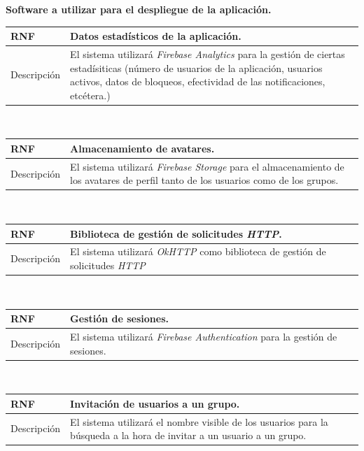 \documentclass[twoside]{report}
\newcommand\addrow[2]{#1 &#2\\ }
\newcommand\addheading[2]{#1 &#2\\ \hline}
\newcommand\tabularhead{\begin{tabular}{lp{0.7\textwidth}}
\hline
}
\newenvironment{req}{\tabularhead}
{\hline\end{tabular}}
\begin{document}
\vspace{1cm}

\textbf{Software a utilizar para el despliegue de la aplicación.}\\

\begin{req}
	\addheading{\textbf{RNF\arabic{nonFunctionalRequirements}}}{Datos estadísticos de la aplicación.}
	\addrow{Descripción}{El sistema utilizará \textit{Firebase Analytics} para la gestión de ciertas estadísiticas (número de usuarios de la aplicación, usuarios activos, datos de bloqueos, efectividad de las notificaciones, etcétera.)}
\end{req}\\

\vspace{0.25cm}

\begin{req}
	\addheading{\textbf{RNF\arabic{nonFunctionalRequirements}}}{Almacenamiento de avatares.}
	\addrow{Descripción}{El sistema utilizará \textit{Firebase Storage} para el almacenamiento de los avatares de perfil tanto de los usuarios como de los grupos.}
\end{req}\\

\vspace{0.25cm}

\begin{req}
	\addheading{\textbf{RNF\arabic{nonFunctionalRequirements}}}{Biblioteca de gestión de solicitudes \textit{HTTP}.}
	\addrow{Descripción}{El sistema utilizará \textit{OkHTTP} como biblioteca de gestión de solicitudes \textit{HTTP}}
\end{req}\\

\vspace{0.25cm}

\begin{req}
	\addheading{\textbf{RNF\arabic{nonFunctionalRequirements}}}{Gestión de sesiones.}
	\addrow{Descripción}{El sistema utilizará \textit{Firebase Authentication} para la gestión de sesiones.}
\end{req}\\

\vspace{0.25cm}
	
\begin{req}
	\addheading{\textbf{RNF\arabic{nonFunctionalRequirements}}}{Invitación de usuarios a un grupo.}
	\addrow{Descripción}{El sistema utilizará el nombre visible de los usuarios para la búsqueda a la hora de invitar a un usuario a un grupo.}
\end{req}\\
\end{document}

